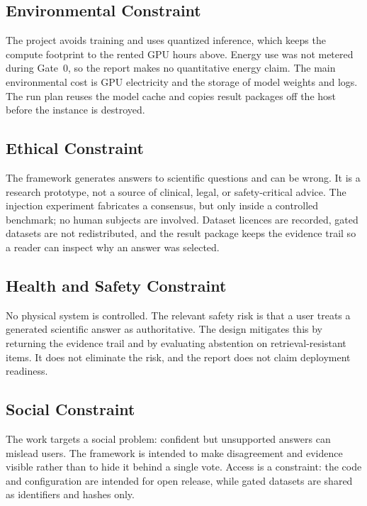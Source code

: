 \subsection{Environmental Constraint}

The project avoids training and uses quantized inference, which keeps the compute footprint to the rented GPU hours above. Energy use was not metered during Gate~0, so the report makes no quantitative energy claim. The main environmental cost is GPU electricity and the storage of model weights and logs. The run plan reuses the model cache and copies result packages off the host before the instance is destroyed.

\subsection{Ethical Constraint}

The framework generates answers to scientific questions and can be wrong. It is a research prototype, not a source of clinical, legal, or safety-critical advice. The injection experiment fabricates a consensus, but only inside a controlled benchmark; no human subjects are involved. Dataset licences are recorded, gated datasets are not redistributed, and the result package keeps the evidence trail so a reader can inspect why an answer was selected.

\subsection{Health and Safety Constraint}

No physical system is controlled. The relevant safety risk is that a user treats a generated scientific answer as authoritative. The design mitigates this by returning the evidence trail and by evaluating abstention on retrieval-resistant items. It does not eliminate the risk, and the report does not claim deployment readiness.

\subsection{Social Constraint}

The work targets a social problem: confident but unsupported answers can mislead users. The framework is intended to make disagreement and evidence visible rather than to hide it behind a single vote. Access is a constraint: the code and configuration are intended for open release, while gated datasets are shared as identifiers and hashes only.

